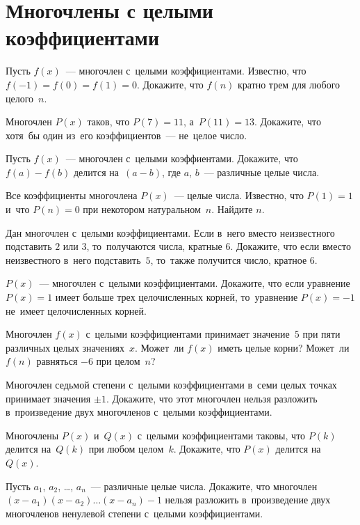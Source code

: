 
\section*{Многочлены с целыми коэффициентами}


\begin{problems}

\item
Пусть $f(x)$~--- многочлен с~целыми коэффициентами.
Известно, что $f(-1) = f(0) = f(1) = 0$.
Докажите, что $f(n)$ кратно трем для любого целого~$n$.

\item
Многочлен $P(x)$ таков, что $P(7) = 11$, а~$P(11) = 13$.
Докажите, что хотя~бы один из~его коэффициентов~--- не~целое число.

\item
Пусть $f(x)$~--- многочлен с~целыми коэффиентами.
Докажите, что $f(a) - f(b)$ делится на~$(a - b)$, где $a$, $b$~--- различные
целые числа.

\item
Все коэффициенты многочлена $P(x)$~--- целые числа.
Известно, что $P(1) = 1$ и~что $P(n) = 0$ при некотором натуральном~$n$.
Найдите $n$.

\item
Дан многочлен с~целыми коэффициентами.
Если в~него вместо неизвестного подставить $2$ или $3$, то~получаются числа,
кратные $6$.
Докажите, что если вместо неизвестного в~него подставить~$5$, то~также
получится число, кратное $6$.

\item
$P(x)$~--- многочлен с~целыми коэффициентами.
Докажите, что если уравнение $P(x) = 1$ имеет больше трех целочисленных корней,
то~уравнение $P(x) = -1$ не~имеет целочисленных корней.

\item
Многочлен $f(x)$ с~целыми коэффициентами принимает значение~$5$ при пяти
различных целых значениях~$x$.
Может~ли $f(x)$ иметь целые корни?
Может~ли $f(n)$ равняться $-6$ при целом~$n$?

\item
Многочлен седьмой степени с~целыми коэффициентами в~семи целых точках принимает
значения $\pm 1$.
Докажите, что этот многочлен нельзя разложить в~произведение двух многочленов
с~целыми коэффициентами.

\item
Многочлены $P(x)$ и~$Q(x)$ с~целыми коэффициентами таковы, что $P(k)$
делится на~$Q(k)$ при любом целом~$k$.
Докажите, что $P(x)$ делится на~$Q(x)$.

\item
Пусть $a_{1}$, $a_{2}$, \ldots, $a_{n}$~--- различные целые числа.
Докажите, что многочлен
\(
    (x - a_{1}) (x - a_{2}) \ldots (x - a_{n}) - 1
\)
нельзя разложить в~произведение двух многочленов ненулевой степени с~целыми
коэффициентами.

\end{problems}

